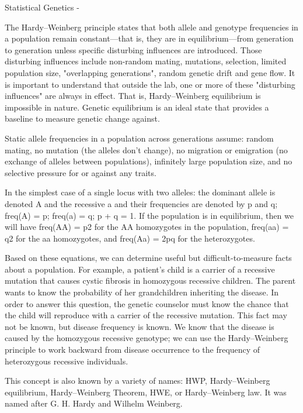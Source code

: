 Statistical Genetics - 
 
The Hardy–Weinberg principle states that both allele and genotype frequencies in a population remain constant—that is, they are in equilibrium—from generation to generation unless specific disturbing influences are introduced. Those disturbing influences include non-random mating, mutations, selection, limited population size, "overlapping generations", random genetic drift and gene flow. It is important to understand that outside the lab, one or more of these "disturbing influences" are always in effect. That is, Hardy–Weinberg equilibrium is impossible in nature. Genetic equilibrium is an ideal state that provides a baseline to measure genetic change against.
 
Static allele frequencies in a population across generations assume: random mating, no mutation (the alleles don't change), no migration or emigration (no exchange of alleles between populations), infinitely large population size, and no selective pressure for or against any traits.
 
In the simplest case of a single locus with two alleles: the dominant allele is denoted A and the recessive a and their frequencies are denoted by p and q; freq(A) = p; freq(a) = q; p + q = 1. If the population is in equilibrium, then we will have freq(AA) = p2 for the AA homozygotes in the population, freq(aa) = q2 for the aa homozygotes, and freq(Aa) = 2pq for the heterozygotes.
 
Based on these equations, we can determine useful but difficult-to-measure facts about a population. For example, a patient's child is a carrier of a recessive mutation that causes cystic fibrosis in homozygous recessive children. The parent wants to know the probability of her grandchildren inheriting the disease. In order to answer this question, the genetic counselor must know the chance that the child will reproduce with a carrier of the recessive mutation. This fact may not be known, but disease frequency is known. We know that the disease is caused by the homozygous recessive genotype; we can use the Hardy–Weinberg principle to work backward from disease occurrence to the frequency of heterozygous recessive individuals.
 
This concept is also known by a variety of names: HWP, Hardy–Weinberg equilibrium, Hardy–Weinberg Theorem, HWE, or Hardy–Weinberg law. It was named after G. H. Hardy and Wilhelm Weinberg.

